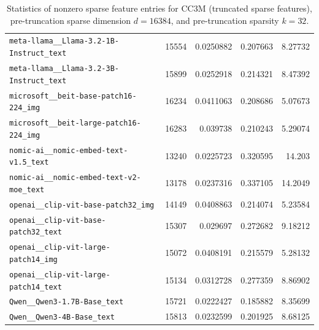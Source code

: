 \begin{table}[htbp]
{\begin{tabular}{lrrrr}
\texttt{meta-llama\_\_Llama-3.2-1B-Instruct\_text} & 15554 & 0.0250882 & 0.207663 & 8.27732 \\
\texttt{meta-llama\_\_Llama-3.2-3B-Instruct\_text} & 15899 & 0.0252918 & 0.214321 & 8.47392 \\
\texttt{microsoft\_\_beit-base-patch16-224\_img} & 16234 & 0.0411063 & 0.208686 & 5.07673 \\
\texttt{microsoft\_\_beit-large-patch16-224\_img} & 16283 & 0.039738 & 0.210243 & 5.29074 \\
\texttt{nomic-ai\_\_nomic-embed-text-v1.5\_text} & 13240 & 0.0225723 & 0.320595 & 14.203 \\
\texttt{nomic-ai\_\_nomic-embed-text-v2-moe\_text} & 13178 & 0.0237316 & 0.337105 & 14.2049 \\
\texttt{openai\_\_clip-vit-base-patch32\_img} & 14149 & 0.0408863 & 0.214074 & 5.23584 \\
\texttt{openai\_\_clip-vit-base-patch32\_text} & 15307 & 0.029697 & 0.272682 & 9.18212 \\
\texttt{openai\_\_clip-vit-large-patch14\_img} & 15072 & 0.0408191 & 0.215579 & 5.28132 \\
\texttt{openai\_\_clip-vit-large-patch14\_text} & 15134 & 0.0312728 & 0.277359 & 8.86902 \\
\texttt{Qwen\_\_Qwen3-1.7B-Base\_text} & 15721 & 0.0222427 & 0.185882 & 8.35699 \\
\texttt{Qwen\_\_Qwen3-4B-Base\_text} & 15813 & 0.0232599 & 0.201925 & 8.68125 \\
\bottomrule
\end{tabular}
}%
\caption{Statistics of nonzero sparse feature entries for CC3M (truncated sparse features), pre-truncation sparse dimension $d=16384$, and pre-truncation sparsity $k=32$.}
\label{tab:sparse-feature-entries-cc3m-truncated-d16384-k32}
\end{table}
